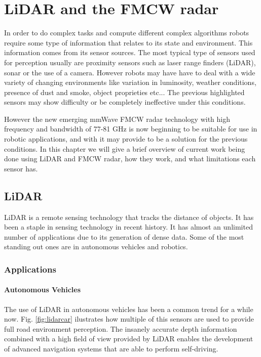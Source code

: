 \chapter{LiDAR and the FMCW radar} \label{ch:Concepts}

In order to do complex tasks and compute different complex algorithms robots require some type of information that relates to its state and environment. This information comes from its sensor sources.
The most typical type of sensors used for perception usually are proximity sensors such as laser range finders (\ac{LiDAR}), sonar or the use of a camera. However robots may have have to deal with a wide variety of changing environments like variation in luminosity, weather conditions, presence of dust and smoke, object proprieties etc... The previous highlighted sensors may show difficulty or be completely ineffective under this conditions.

However the new emerging \ac{mmWave} \ac{FMCW} radar technology with high frequency and bandwidth of 77-81 GHz is now beginning to be suitable for use in robotic applications, and with it may provide to be a solution for the previous conditions. In this chapter we will give a brief overview of current work being done using \ac{LiDAR} and \ac{FMCW} \ac{radar}, how they work, and what limitations each sensor has.


\section{LiDAR}
\ac{LiDAR} is a remote sensing technology that tracks the distance of objects. It has been a staple in sensing technology in recent history. It has almost an  unlimited  number of applications \cite{lidar100uses} due to its generation of dense data. Some of the most standing out ones are in autonomous vehicles and robotics.
\subsection{Applications}

\subsubsection{Autonomous Vehicles}

The use of \ac{LiDAR} in autonomous vehicles has been a common trend for a while now. Fig. \ref{fig:lidarcar} ilustrates how multiple of this sensors are used to provide full road environment perception. The insanely accurate depth information combined with a high field of view provided by \ac{LiDAR} enables the development of advanced navigation systems that are able to perform self-driving.
 
